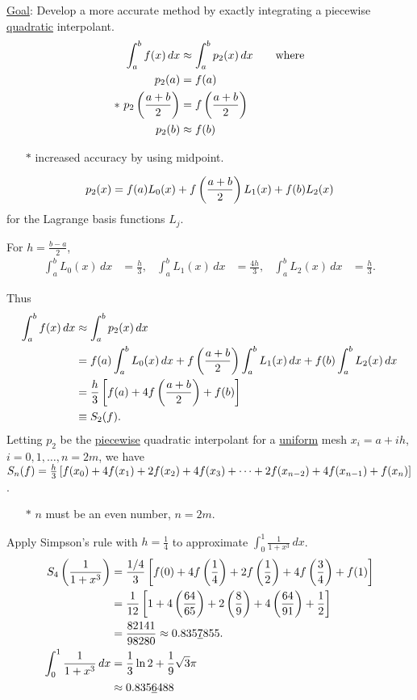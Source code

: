 \documentclass[]{article}
\begin{document}
\ul{Goal}: Develop a more accurate method by exactly integrating a piecewise \ul{quadratic} interpolant.
\begin{align*}
	\int_a^b f(x)\,dx &\approx \int_a^b p_2(x)\,dx \qquad \text{where} \\
	p_2(a) &= f(a) \\
	* \ p_2\left(\frac{a+b}2\right) &= f\left(\frac{a+b}2\right) \\
	p_2(b) &\approx f(b) \\
\end{align*}
\begin{enumerate}
	\item[$*$] increased accuracy by using midpoint.
\end{enumerate}
$$ p_2(x) = f(a) L_0(x) + f\left(\frac{a+b}2\right)L_1(x) + f(b)L_2(x)$$ for the Lagrange basis functions $L_j$.
\begin{fact}For $h = \frac{b-a}2$,
	\begin{align*}
		\int_a^b L_0(x)\,dx &= \frac h3, &
		\int_a^b L_1(x)\,dx &= \frac{4h}3, &
		\int_a^b L_2(x)\,dx &= \frac h3.
	\end{align*}
\end{fact}
Thus
\begin{align*}
	\int_a^b f(x)\,dx &\approx \int_a^b p_2(x)\,dx \\
					  &= f(a)\int_a^b L_0(x)\,dx + f\left(\frac{a+b}2\right)\int_a^b L_1(x)\,dx + f(b)\int_a^b L_2(x)\,dx \\
					  &= \frac h3\left[f(a)+4f\left(\frac{a+b}2\right)+f(b)\right] \\
					  &\equiv S_2(f).
\end{align*}
Letting $p_2$ be the \ul{piecewise} quadratic interpolant for a \ul{uniform} mesh $x_i=a+ih$, $i=0,1,\dots,n=2m$, we have $S_n(f) = \frac h3\left[f(x_0)+4f(x_1)+2f(x_2)+4f(x_3)+ \dots + 2f(x_{n-2})+4f(x_{n-1})+f(x_n)\right]$.
\begin{enumerate}
	\item[$*$] $n$ must be an even number, $n=2m$.
\end{enumerate}
\begin{example}
	Apply Simpson's rule with $h=\frac14$ to approximate $\int_0^1 \frac1{1+x^3}\,dx$.
	\begin{align*}
		S_4\left(\frac1{1+x^3}\right)
		&= \frac{1/4}3\left[ f(0)+4f\left(\frac14\right)+2f\left(\frac12\right)+4f\left(\frac34\right)+f(1)\right] \\
		&= \frac1{12}\left[1+4\left(\frac{64}{65}\right)+2\left(\frac89\right)+4\left(\frac{64}{91}\right)+\frac12\right] \\
		&= \frac{82141}{98280} \approx 0.835\underline{7}855. \\
		\int_0^1 \frac1{1+x^3}\,dx &= \frac13\ln2+\frac19\sqrt3\pi \\
								   &\approx 0.835\underline{6}488
	\end{align*}
\end{example}
\end{document}
